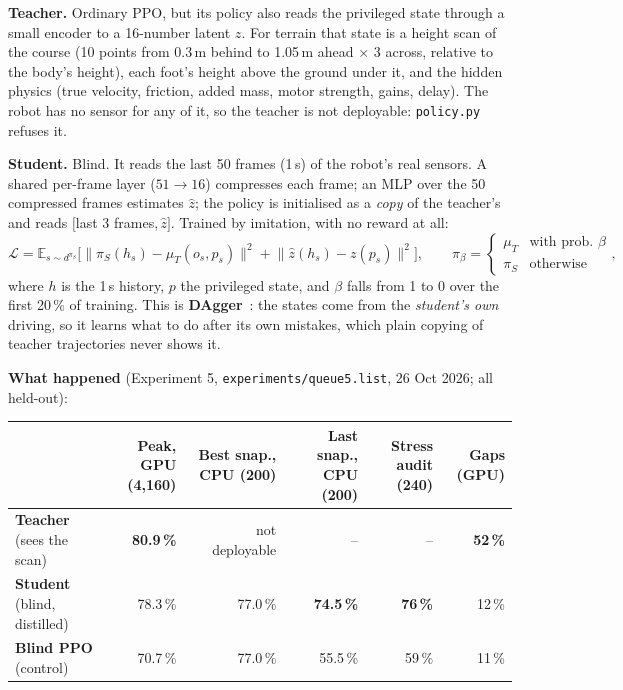 \documentclass[10pt,letterpaper]{article}
\begin{document}
\textbf{Teacher.} Ordinary PPO, but its policy also reads the privileged state through a small encoder to a 16-number latent $z$.
For terrain that state is a height scan of the course (10 points from 0.3\,m behind to 1.05\,m ahead $\times$ 3 across, relative to
the body's height), each foot's height above the ground under it, and the hidden physics (true velocity, friction, added mass, motor
strength, gains, delay). The robot has no sensor for any of it, so the teacher is not deployable: \texttt{policy.py} refuses it.

\textbf{Student.} Blind. It reads the last 50 frames (1\,s) of the robot's real sensors. A shared per-frame layer ($51\to16$)
compresses each frame; an MLP over the 50 compressed frames estimates $\hat z$; the policy is initialised as a \emph{copy} of the
teacher's and reads $[$last 3 frames$, \hat z]$. Trained by imitation, with no reward at all:
\[
\mathcal{L}=\mathbb{E}_{s\sim d^{\pi_\beta}}\Big[\lVert \pi_S(h_s)-\mu_T(o_s,p_s)\rVert^2+\lVert \hat z(h_s)-z(p_s)\rVert^2\Big],
\qquad \pi_\beta=\begin{cases}\mu_T & \text{with prob. }\beta\\ \pi_S & \text{otherwise}\end{cases},
\]
where $h$ is the 1\,s history, $p$ the privileged state, and $\beta$ falls from 1 to 0 over the first 20\,\% of training.
This is \textbf{DAgger}~\cite{ross2011}: the states come from the \emph{student's own} driving, so it learns what to do after
its own mistakes, which plain copying of teacher trajectories never shows it.

\textbf{What happened} (Experiment 5, \texttt{experiments/queue5.list}, 26 Oct 2026; all held-out):

\begin{small}
\begin{tabularx}{\linewidth}{@{}Xrrrrr@{}}
\toprule
& Peak, GPU (4{,}160) & Best snap., CPU (200) & Last snap., CPU (200) & Stress audit (240) & Gaps (GPU) \\ \midrule
\textcolor{Teach}{\textbf{Teacher}} (sees the scan) & \textbf{80.9\,\%} & not deployable & -- & -- & \textbf{52\,\%} \\
\textcolor{Stud}{\textbf{Student}} (blind, distilled) & 78.3\,\% & 77.0\,\% & \textbf{74.5\,\%} & \textbf{76\,\%} & 12\,\% \\
\textcolor{Blind}{\textbf{Blind PPO}} (control) & 70.7\,\% & 77.0\,\% & 55.5\,\% & 59\,\% & 11\,\% \\ \bottomrule
\end{tabularx}
\end{small}
\end{document}
